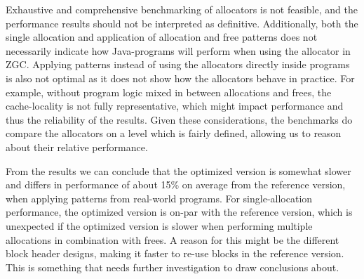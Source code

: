 






Exhaustive and comprehensive benchmarking of allocators is not feasible, and the performance results should not be interpreted as definitive. Additionally, both the single allocation and application of allocation and free patterns does not necessarily indicate how Java-programs will perform when using the allocator in ZGC. Applying patterns instead of using the allocators directly inside programs is also not optimal as it does not show how the allocators behave in practice. For example, without program logic mixed in between allocations and frees, the cache-locality is not fully representative, which might impact performance and thus the reliability of the results. Given these considerations, the benchmarks do compare the allocators on a level which is fairly defined, allowing us to reason about their relative performance. 

From the results we can conclude that the optimized version is somewhat slower and differs in performance of about 15\% on average from the reference version, when applying patterns from real-world programs. For single-allocation performance, the optimized version is on-par with the reference version, which is unexpected if the optimized version is slower when performing multiple allocations in combination with frees. A reason for this might be the different block header designs, making it faster to re-use blocks in the reference version. This is something that needs further investigation to draw conclusions about.

